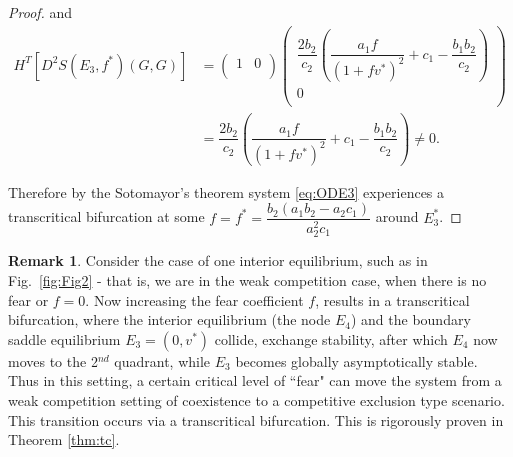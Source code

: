 \documentclass[10pt]{amsart}
\theoremstyle{definition}
\newtheorem{remark}{Remark}
\begin{document}
\begin{proof}
and 
\begin{equation*}
\begin{split}
H^{T}\left[D^2 S\left(E_3,f^* \right)(G,G)\right] &= \left(
\begin{array}{cc}
 1 & 0 \\
\end{array}
\right) 
\left(
\begin{array}{ccc}
 \dfrac{2b_2}{c_2}\left(\dfrac{a_1f}{\left(1+fv^*\right)^2}+c_1-\dfrac{b_1 b_2}{c_2} \right)  \\
  0 \\
\end{array}
\right) \\
& = \dfrac{2b_2}{c_2}\left(\dfrac{a_1f}{\left(1+fv^*\right)^2}+c_1-\dfrac{b_1 b_2}{c_2} \right)  \neq 0.
\end{split}
\end{equation*}

Therefore by the Sotomayor's theorem system \eqref{eq:ODE3} experiences a transcritical bifurcation at some $f=f^*=\dfrac{b_2 \left(a_1 b_2-a_2 c_1\right)}{a_2^2 c_1}$ around $E_3^*$.
\end{proof}


\begin{remark}
	Consider the case of one interior equilibrium, such as in Fig.~\ref{fig:Fig2} - that is, we are in the weak competition case, when there is no fear or $f=0$. Now increasing the fear coefficient $f$, results in a transcritical bifurcation, where the interior equilibrium (the node $E_{4}$) and the boundary saddle equilibrium $E_{3} = (0, v^{*})$ collide, exchange stability, after which $E_{4}$ now moves to the 2$^{nd}$ quadrant, while $E_{3}$
becomes globally asymptotically stable. Thus in this setting, a certain critical level of ``fear" can move the system from a weak competition setting of coexistence to a competitive exclusion type scenario. This transition occurs via a transcritical bifurcation.
	This is rigorously proven in Theorem \ref{thm:tc}.
\end{remark}
\end{document}
